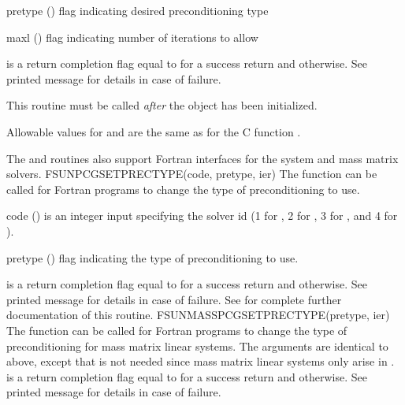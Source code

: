 {
  \begin{args}[pretype]
  \item[pretype] ()
    flag indicating desired preconditioning type
  \item[maxl] ()
    flag indicating number of iterations to allow
  \end{args}
}
{
   is a  return completion flag equal to  for a success
  return and  otherwise. See printed message for details in case
  of failure.
}
{
  This routine must be called \emph{after} the {\nvector} object has
  been initialized.

  Allowable values for  and  are the same as for
  the C function .
}
%
%
The  and
 routines also support Fortran
interfaces for the system and mass matrix solvers.
%
%
{
  FSUNPCGSETPRECTYPE(code, pretype, ier)
}
{
  The function  can be called for Fortran
  programs to change the type of preconditioning to use.
}
{
  \begin{args}[pretype]
  \item[code] ()
    is an integer input specifying the solver id (1 for {\cvode}, 2
    for {\ida}, 3 for {\kinsol}, and 4 for {\arkode}).
  \item[pretype] ()
    flag indicating the type of preconditioning to use.
  \end{args}
}
{
   is a  return completion flag equal to  for a success
  return and  otherwise. See printed message for details in case
  of failure.
}
{
  See  for complete further documentation of
  this routine.
}
%
%
{
  FSUNMASSPCGSETPRECTYPE(pretype, ier)
}
{
  The function  can be called for Fortran
  programs to change the type of preconditioning for mass matrix
  linear systems.
}
{
  The arguments are identical to  above,
  except that  is not needed since mass matrix linear systems
  only arise in {\arkode}.
}
{
   is a  return completion flag equal to  for a success
  return and  otherwise. See printed message for details in case
  of failure.
}
